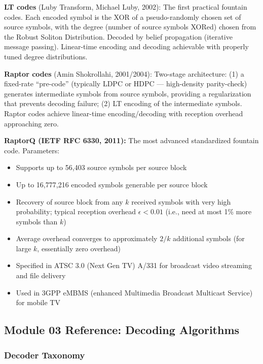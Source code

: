 \documentclass[11pt,letterpaper]{article}
\begin{document}
\textbf{LT codes} (Luby Transform, Michael Luby, 2002): The first practical fountain codes. Each encoded symbol is the XOR of a pseudo-randomly chosen set of source symbols, with the degree (number of source symbols XORed) chosen from the Robust Soliton Distribution. Decoded by belief propagation (iterative message passing). Linear-time encoding and decoding achievable with properly tuned degree distributions.

\textbf{Raptor codes} (Amin Shokrollahi, 2001/2004): Two-stage architecture: (1) a fixed-rate ``pre-code'' (typically LDPC or HDPC --- high-density parity-check) generates intermediate symbols from source symbols, providing a regularization that prevents decoding failure; (2) LT encoding of the intermediate symbols. Raptor codes achieve linear-time encoding/decoding with reception overhead approaching zero.

\textbf{RaptorQ (IETF RFC 6330, 2011):} The most advanced standardized fountain code. Parameters:
\begin{itemize}[leftmargin=*]
  \item Supports up to 56,403 source symbols per source block
  \item Up to 16,777,216 encoded symbols generable per source block
  \item Recovery of source block from any $k$ received symbols with very high probability; typical reception overhead $\epsilon < 0.01$ (i.e., need at most 1\% more symbols than $k$)
  \item Average overhead converges to approximately $2/k$ additional symbols (for large $k$, essentially zero overhead)
  \item Specified in ATSC 3.0 (Next Gen TV) A/331 for broadcast video streaming and file delivery
  \item Used in 3GPP eMBMS (enhanced Multimedia Broadcast Multicast Service) for mobile TV
\end{itemize}

\subsection{Module 03 Reference: Decoding Algorithms}

\subsubsection{Decoder Taxonomy}
\end{document}
